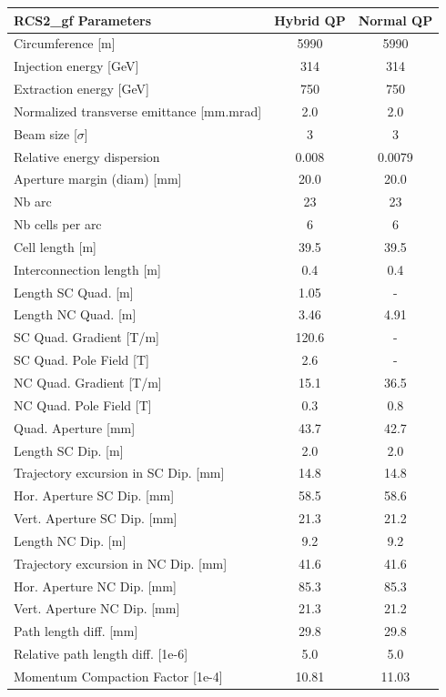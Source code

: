 \begin{tabular}{lcc}
\toprule
RCS2_gf Parameters & Hybrid QP & Normal QP \\
\midrule
Circumference [m] & 5990 & 5990 \\
Injection energy [GeV] & 314 & 314 \\
Extraction energy [GeV] & 750 & 750 \\
Normalized transverse emittance [mm.mrad] & 2.0 & 2.0 \\
Beam size [$\sigma$] & 3 & 3 \\
Relative energy dispersion & 0.008 & 0.0079 \\
Aperture margin (diam) [mm] & 20.0 & 20.0 \\
Nb arc & 23 & 23 \\
Nb cells per arc & 6 & 6 \\
Cell length [m] & 39.5 & 39.5 \\
Interconnection length [m] & 0.4 & 0.4 \\
Length SC Quad. [m] & 1.05 & - \\
Length NC Quad. [m] & 3.46 & 4.91 \\
SC Quad. Gradient [T/m] & 120.6 & - \\
SC Quad. Pole Field [T] & 2.6 & - \\
NC Quad. Gradient [T/m] & 15.1 & 36.5 \\
NC Quad. Pole Field [T] & 0.3 & 0.8 \\
Quad. Aperture [mm] & 43.7 & 42.7 \\
Length SC Dip. [m] & 2.0 & 2.0 \\
Trajectory excursion in SC Dip. [mm] & 14.8 & 14.8 \\
Hor. Aperture SC Dip. [mm] & 58.5 & 58.6 \\
Vert. Aperture SC Dip. [mm] & 21.3 & 21.2 \\
Length NC Dip. [m] & 9.2 & 9.2 \\
Trajectory excursion in NC Dip. [mm] & 41.6 & 41.6 \\
Hor. Aperture NC Dip. [mm] & 85.3 & 85.3 \\
Vert. Aperture NC Dip. [mm] & 21.3 & 21.2 \\
Path length diff. [mm] & 29.8 & 29.8 \\
Relative path length diff. [1e-6] & 5.0 & 5.0 \\
Momentum Compaction Factor [1e-4] & 10.81 & 11.03 \\
\bottomrule
\end{tabular}
